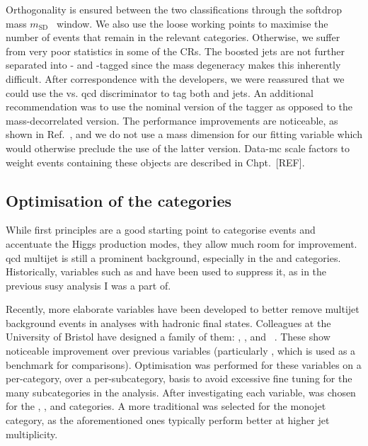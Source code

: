 \medskip

\noindent{}Orthogonality is ensured between the two classifications through the softdrop mass $m_{\mathrm{SD}}$~\cite{Larkoski:2014wba} window. We also use the loose working points to maximise the number of events that remain in the relevant categories. Otherwise, we suffer from very poor statistics in some of the \glspl{CR}. The boosted \PVec \glspl{jet} are not further separated into \PW- and \PZ-tagged since the mass degeneracy makes this inherently difficult. After correspondence with the \deepakeight developers, we were reassured that we could use the \PW vs. \acrshort{qcd} discriminator to tag both \PW and \PZ \glspl{jet}. An additional recommendation was to use the nominal version of the tagger as opposed to the mass-decorrelated version. The performance improvements are noticeable, as shown in Ref.~, and we do not use a mass dimension for our fitting variable which would otherwise preclude the use of the latter version. Data-\acrshort{mc} scale factors to weight events containing these objects are described in Chpt.~[REF].




\subsection{Optimisation of the categories}
\label{subsec:htoinv_cat_optimisation}


While first principles are a good starting point to categorise events and accentuate the Higgs production modes, they allow much room for improvement. \acrshort{qcd} multijet is still a prominent background, especially in the \ttH and \ggH categories. Historically, variables such as \biasedDPhi and \alphat have been used to suppress it, as in the previous \acrlong{susy} analysis I was a part of.

Recently, more elaborate variables have been developed to better remove multijet background events in analyses with hadronic final states. Colleagues at the University of Bristol have designed a family of them: \minChi, \omegaHat, and \omegaTilde~\cite{Sakuma:2018xrq}. These show noticeable improvement over previous variables (particularly \biasedDPhi, which is used as a benchmark for comparisons). Optimisation was performed for these variables on a per-category, over a per-subcategory, basis to avoid excessive fine tuning for the many subcategories in the analysis. After investigating each variable, \omegaTilde was chosen for the \ttH, \VH, and \ggH categories. A more traditional \mindphiJetMet was selected for the monojet category, as the aforementioned ones typically perform better at higher \gls{jet} multiplicity.

